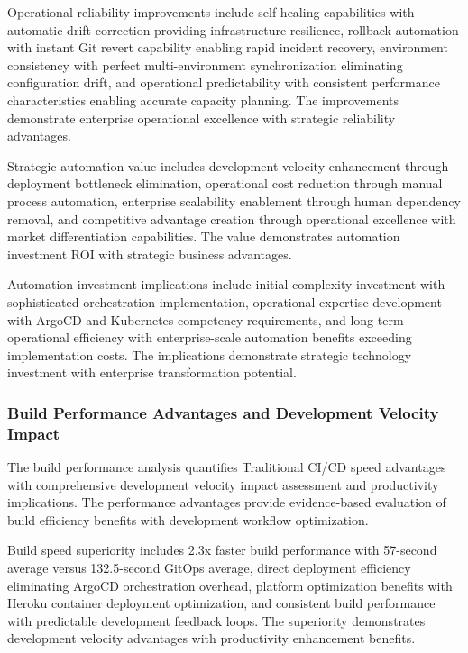 Operational reliability improvements include self-healing capabilities with automatic drift correction providing infrastructure resilience, rollback automation with instant Git revert capability enabling rapid incident recovery, environment consistency with perfect multi-environment synchronization eliminating configuration drift, and operational predictability with consistent performance characteristics enabling accurate capacity planning. The improvements demonstrate enterprise operational excellence with strategic reliability advantages.

Strategic automation value includes development velocity enhancement through deployment bottleneck elimination, operational cost reduction through manual process automation, enterprise scalability enablement through human dependency removal, and competitive advantage creation through operational excellence with market differentiation capabilities. The value demonstrates automation investment ROI with strategic business advantages.

Automation investment implications include initial complexity investment with sophisticated orchestration implementation, operational expertise development with ArgoCD and Kubernetes competency requirements, and long-term operational efficiency with enterprise-scale automation benefits exceeding implementation costs. The implications demonstrate strategic technology investment with enterprise transformation potential.

\subsubsection{Build Performance Advantages and Development Velocity Impact}

The build performance analysis quantifies Traditional CI/CD speed advantages with comprehensive development velocity impact assessment and productivity implications. The performance advantages provide evidence-based evaluation of build efficiency benefits with development workflow optimization.

Build speed superiority includes 2.3x faster build performance with 57-second average versus 132.5-second GitOps average, direct deployment efficiency eliminating ArgoCD orchestration overhead, platform optimization benefits with Heroku container deployment optimization, and consistent build performance with predictable development feedback loops. The superiority demonstrates development velocity advantages with productivity enhancement benefits.

